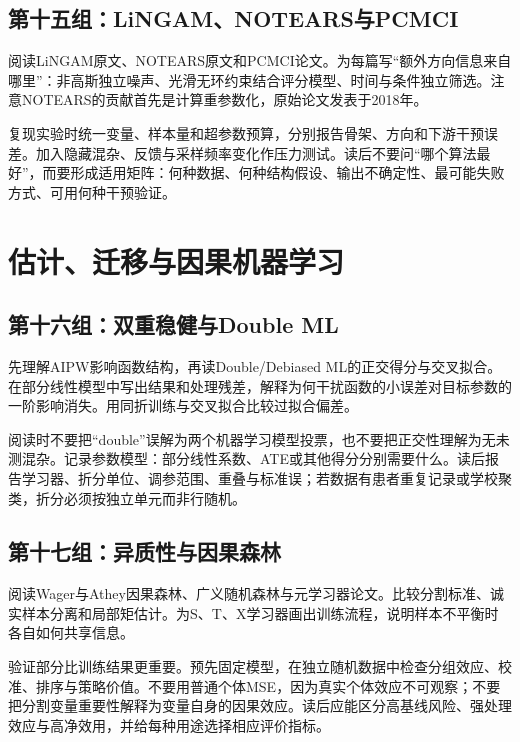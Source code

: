 \subsection*{第十五组：LiNGAM、NOTEARS与PCMCI}

阅读LiNGAM原文、NOTEARS原文和PCMCI论文\parencite{shimizu2006,zheng2018,runge2019}。为每篇写“额外方向信息来自哪里”：非高斯独立噪声、光滑无环约束结合评分模型、时间与条件独立筛选。注意NOTEARS的贡献首先是计算重参数化，原始论文发表于2018年。

复现实验时统一变量、样本量和超参数预算，分别报告骨架、方向和下游干预误差。加入隐藏混杂、反馈与采样频率变化作压力测试。读后不要问“哪个算法最好”，而要形成适用矩阵：何种数据、何种结构假设、输出不确定性、最可能失败方式、可用何种干预验证。

\section{估计、迁移与因果机器学习}

\subsection*{第十六组：双重稳健与Double ML}

先理解AIPW影响函数结构，再读Double/Debiased ML的正交得分与交叉拟合\parencite{chernozhukov2018}。在部分线性模型中写出结果和处理残差，解释为何干扰函数的小误差对目标参数的一阶影响消失。用同折训练与交叉拟合比较过拟合偏差。

阅读时不要把“double”误解为两个机器学习模型投票，也不要把正交性理解为无未测混杂。记录参数模型：部分线性系数、ATE或其他得分分别需要什么。读后报告学习器、折分单位、调参范围、重叠与标准误；若数据有患者重复记录或学校聚类，折分必须按独立单元而非行随机。

\subsection*{第十七组：异质性与因果森林}

阅读Wager与Athey因果森林、广义随机森林与元学习器论文\parencite{wagerathey2018,athey2019,kunzel2019}。比较分割标准、诚实样本分离和局部矩估计。为S、T、X学习器画出训练流程，说明样本不平衡时各自如何共享信息。

验证部分比训练结果更重要。预先固定模型，在独立随机数据中检查分组效应、校准、排序与策略价值。不要用普通个体MSE，因为真实个体效应不可观察；不要把分割变量重要性解释为变量自身的因果效应。读后应能区分高基线风险、强处理效应与高净效用，并给每种用途选择相应评价指标。

